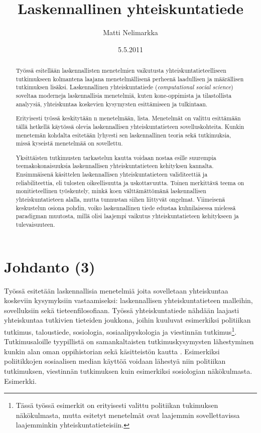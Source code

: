 \documentclass[finnish,gradu,twoside,12pt]{tktltiki}
\begin{document}

\title{Laskennallinen yhteiskuntatiede}
\author{Matti Nelimarkka}
\date{5.5.2011}

\numberofpagesinformation{}

\keywords{}

\maketitle

\begin{abstract}
Työssä esitellään laskennallisten menetelmien vaikutusta yhteiskuntatieteelliseen tutkimukseen kolmantena laajana menetelmällisenä perheenä laadullisen ja määrällisen tutkimuksen lisäksi. Laskennallinen yhteiskuntatiede (\textit{computational social science}) soveltaa moderneja laskennallisia menetelmiä, kuten kone-oppimista ja tilastollista analyysiä, yhteiskuntaa koskevien kysymysten esittämiseen ja tulkintaan.

Erityisesti työssä keskitytään n menetelmään, lista. Menetelmät on valittu esittämään tällä hetkellä käytössä olevia laskennallisen yhteiskuntatieteen sovelluskohteita. Kunkin menetemän kohdalta esitetään lyhyesti sen laskennallinen teoria sekä tutkimuksia, missä kyseistä menetelmää on sovellettu.

Yksittäisten tutkimusten tarkastelun kautta voidaan nostaa esille suurempia teemakokonaisuuksia laskennallisen yhteiskuntatieteen kehityksen kannalta. Ensimmäisenä käsittelen laskennallisen yhteiskuntatieteen validiteettiä ja reliabiliteettia, eli tulosten oikeellisuutta ja uskottavuutta. Toinen merkittävä teema on monitieteellinen työskentely, minkä koen välttämättömänä laskennallisen yhteiskuntatieteen alalla, mutta tunnustan siihen liittyvät ongelmat. Viimeisenä keskustelun osiona pohdin, voiko laskennallinen tiede edustaa kuhnilaisessa mielessä paradigman muutosta, millä olisi laajempi vaikutus yhteiskuntatieteen kehitykseen ja tulevaisuuteen.
\end{abstract}

\mytableofcontents

\section{Johdanto (3)}

Työssä esitetään laskennallisia menetelmiä joita sovelletaan yhteiskuntaa koskeviin kysymyksiin vastaamiseksi: laskennallisen yhteiskuntatieteen malleihin, sovelluksiin sekä tieteenfilosofiaan. Työssä yhteiskuntatiede nähdään laajasti yhteiskuntaa tutkivien tieteiden joukkona, joihin kuuluvat esimerkiksi politiikan tutkimus, taloustiede, sosiologia, sosiaalipyskologia ja viestinnän tutkimus\footnote{Tässä työssä esimerkit on erityisesti valittu politiikan tukimuksen näkökulmasta, mutta esitetyt menetelmät ovat laajemmin sovellettavissa laajemminkin yhteiskuntatieteisiin.}. Tutkimusaloille tyypillistä on samankaltaisten tutkimuskysymysten lähestyminen kunkin alan oman oppihistorian sekä käsitteistön kautta \citep{a}. Esimerkiksi poliitikkojen sosiaalisen median käyttöä voidaan lähestyä niin politiikan tutkimuksen, viestinnän tutkimuksen kuin esimerkiksi sosiologian näkökulmasta. Esimerkki.
\end{document}
